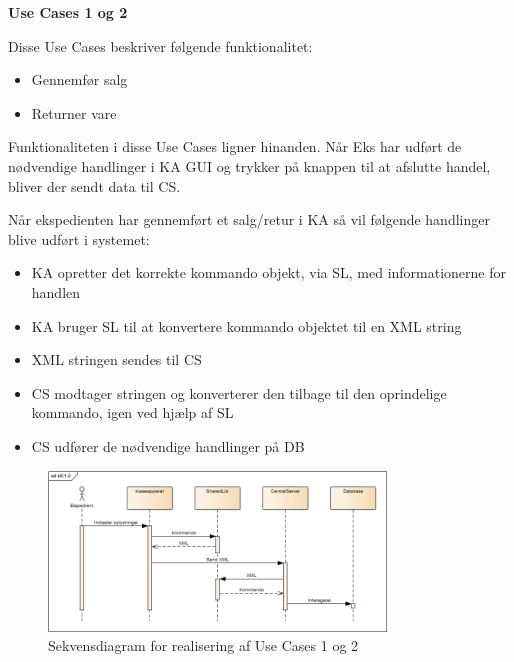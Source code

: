 \textbf{Use Cases 1 og 2}

Disse Use Cases beskriver følgende funktionalitet:
\begin{itemize}
	\item Gennemfør salg
	\item Returner vare
\end{itemize}
Funktionaliteten i disse Use Cases ligner hinanden. Når \gls{Eks} har udført de nødvendige
handlinger i \gls{KA} \gls{GUI} og trykker på knappen til at afslutte handel, bliver der sendt data til \gls{CS}.

Når ekspedienten har gennemført et salg/retur i \gls{KA} så vil følgende
handlinger blive udført i systemet:
\begin{itemize}
	\item \gls{KA} opretter det korrekte kommando objekt, via \gls{SL}, med informationerne for handlen
	\item \gls{KA} bruger \gls{SL} til at konvertere kommando objektet til en XML string
	\item XML stringen sendes til \gls{CS}
	\item \gls{CS} modtager stringen og konverterer den tilbage til den oprindelige kommando, igen ved hjælp af \gls{SL}
	\item \gls{CS} udfører de nødvendige handlinger på \gls{DB}
\end{itemize}

\begin{figure}[H]
	\centering
	\includegraphics[width=0.8\textwidth]{Systemarkitektur/LogiskView/Realiseringer/Images/UC12.png}
	\caption{Sekvensdiagram for realisering af Use Cases 1 og 2}
	\label{fig:uc38sq}
\end{figure}

